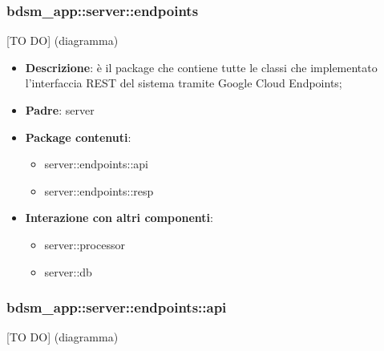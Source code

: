 


\subsubsection{bdsm\_app::server::endpoints} %
\label{ssub:bdsm_app_server_endpoints}
[TO DO] (diagramma) \newline \newline

\begin{itemize}
  \item \textbf{Descrizione}: è il package che contiene tutte le classi che implementato l'interfaccia REST del sistema tramite Google Cloud Endpoints;
  \item \textbf{Padre}: server
  \item \textbf{Package contenuti}:
  	\begin{itemize}
  		\item server::endpoints::api
  		\item server::endpoints::resp
	\end{itemize}
  \item \textbf{Interazione con altri componenti}:
  	\begin{itemize}
  		\item server::processor
  		\item server::db
	\end{itemize}
\end{itemize}

\subsubsection{bdsm\_app::server::endpoints::api} %
\label{ssub:bdsm_app_server_endpoints_api}
[TO DO] (diagramma) \newline \newline

